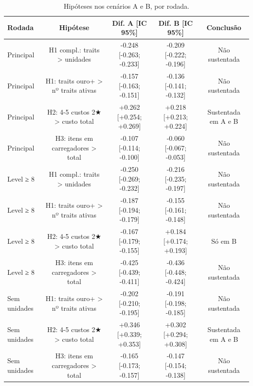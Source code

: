 \begin{table}[htbp]
\caption{Hipóteses nos cenários A e B, por rodada.}
\label{tab:abhyp}
\centering
\small
\begin{tabular}{lcccc}
\toprule
Rodada & Hipótese & Dif. A [IC 95\%] & Dif. B [IC 95\%] & Conclusão \\
\midrule
Principal & H1 compl.: traits > unidades & -0.248 [-0.263; -0.233] & -0.209 [-0.222; -0.196] & Não sustentada \\
Principal & H1: traits ouro+ > nº traits ativas & -0.157 [-0.163; -0.151] & -0.136 [-0.141; -0.132] & Não sustentada \\
Principal & H2: 4-5 custos 2★ > custo total & +0.262 [+0.254; +0.269] & +0.218 [+0.213; +0.224] & Sustentada em A e B \\
Principal & H3: itens em carregadores > total & -0.107 [-0.114; -0.100] & -0.060 [-0.067; -0.053] & Não sustentada \\
Level ≥ 8 & H1 compl.: traits > unidades & -0.250 [-0.269; -0.232] & -0.216 [-0.235; -0.197] & Não sustentada \\
Level ≥ 8 & H1: traits ouro+ > nº traits ativas & -0.187 [-0.194; -0.179] & -0.155 [-0.161; -0.148] & Não sustentada \\
Level ≥ 8 & H2: 4-5 custos 2★ > custo total & -0.167 [-0.179; -0.155] & +0.184 [+0.174; +0.193] & Só em B \\
Level ≥ 8 & H3: itens em carregadores > total & -0.425 [-0.439; -0.411] & -0.436 [-0.448; -0.424] & Não sustentada \\
Sem unidades & H1: traits ouro+ > nº traits ativas & -0.202 [-0.210; -0.195] & -0.191 [-0.198; -0.185] & Não sustentada \\
Sem unidades & H2: 4-5 custos 2★ > custo total & +0.346 [+0.339; +0.353] & +0.302 [+0.294; +0.308] & Sustentada em A e B \\
Sem unidades & H3: itens em carregadores > total & -0.165 [-0.173; -0.157] & -0.147 [-0.154; -0.138] & Não sustentada \\
\bottomrule
\end{tabular}
\end{table}
